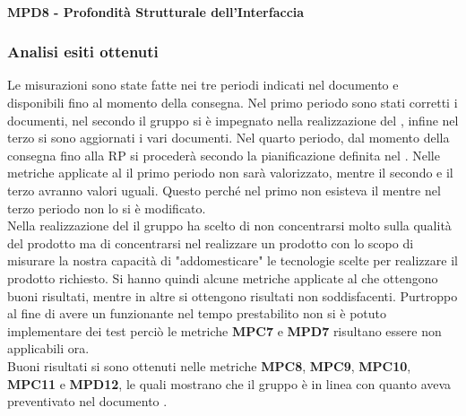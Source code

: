 \paragraph{MPD8 - Profondità Strutturale dell'Interfaccia}
\pgfplotsset{width=17cm, height=8cm}

\subsubsection{Analisi esiti ottenuti}
Le misurazioni sono state fatte nei tre periodi indicati nel documento \PdP{} e disponibili fino al momento della consegna.
Nel primo periodo sono stati corretti i documenti, nel secondo il gruppo \Gruppo{} si è impegnato nella realizzazione del , infine nel terzo si sono aggiornati i vari documenti.
Nel quarto periodo, dal momento della consegna fino alla RP si procederà secondo la pianificazione definita nel \PdP{}.
Nelle metriche applicate al  il primo periodo non sarà valorizzato, mentre il secondo e il terzo avranno valori uguali. Questo perché nel primo non esisteva il  mentre nel terzo periodo non lo si è modificato.\\ 
Nella realizzazione del  il gruppo \Gruppo{} ha scelto di non concentrarsi molto sulla qualità del prodotto ma di concentrarsi nel realizzare un prodotto con lo scopo di misurare la nostra capacità di "addomesticare" le tecnologie scelte per realizzare il prodotto richiesto.
Si hanno quindi alcune metriche applicate al  che ottengono buoni risultati, mentre in altre si ottengono risultati non soddisfacenti.
Purtroppo al fine di avere un  funzionante nel tempo prestabilito non si è potuto implementare dei test perciò le metriche \textbf{MPC7} e \textbf{MPD7} risultano essere non applicabili ora.\\
Buoni risultati si sono ottenuti nelle metriche \textbf{MPC8}, \textbf{MPC9}, \textbf{MPC10}, \textbf{MPC11} e \textbf{MPD12}, le quali mostrano che il gruppo \Gruppo{} è in linea con quanto aveva preventivato nel documento \PdP{}.

